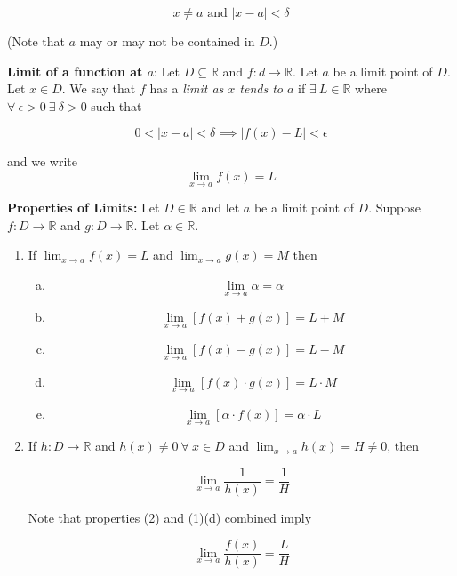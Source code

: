 \[
x \neq a \text{ and } |x - a| < \delta
\]

(Note that \(a\) may or may not be contained in \(D\).)

\textbf{Limit of a function at \(a\)}: Let \(D \subseteq \mathbb{R}\) and \(f:d \to \mathbb{R}\). Let \(a\) be a limit point of \(D\). Let \(x \in D\). We say that \(f\) has a \textit{limit as \(x\) tends to \(a\)} if \(\exists \ L \in \mathbb{R}\) where \(\forall \ \epsilon > 0 \ \exists \ \delta > 0 \) such that

\[
0 < |x - a| < \delta \implies |f(x) - L| < \epsilon
\]

and we write \[\lim_{x \to a} f(x) = L\]

\textbf{Properties of Limits:} Let \(D \in \mathbb{R}\) and let \(a\) be a limit point of \(D\). Suppose \(f:D \to \mathbb{R}\) and \(g: D \to \mathbb{R}\). Let \(\alpha \in \mathbb{R}\).

\begin{enumerate}[(1)]

\item If \(\lim_{x \to a} f(x) = L\) and \(\lim_{x \to a} g(x) = M\) then

\begin{enumerate}[(a)]

\item \[\lim_{x \to a} \alpha = \alpha\]

\item \[\lim_{x \to a} [f(x) + g(x)] = L + M\]

\item \[\lim_{x \to a} [f(x) - g(x)] = L - M\]

\item \[\lim_{x \to a} [f(x) \cdot g(x)] = L \cdot M\]

\item \[\lim_{x \to a} [\alpha \cdot f(x)] = \alpha \cdot L\]

\end{enumerate}

\item If \(h:D \to \mathbb{R}\) and \(h(x) \neq 0 \ \forall \ x \in D\) and \(\lim_{x \to a} h(x) = H \neq 0\), then

\[
\lim_{x \to a} \frac{1}{h(x)} = \frac{1}{H}
\]

Note that properties (2) and (1)(d) combined imply

\[
\lim_{x \to a} \frac{f(x)}{h(x)} = \frac{L}{H}
\]

\end{enumerate}

